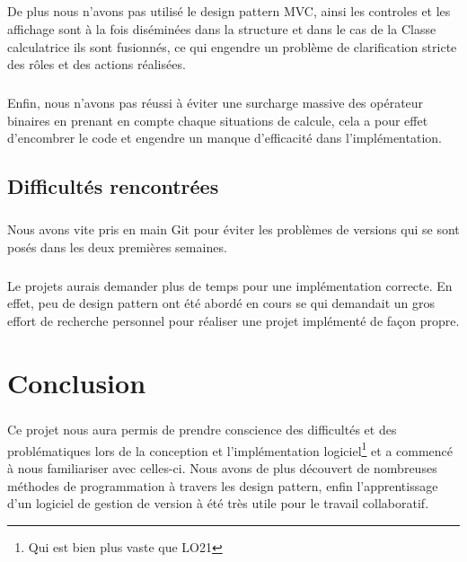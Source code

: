 \documentclass[a4paper,12pt]{report}
\begin{document}
		\paragraph{}De plus nous n'avons pas utilisé le design pattern MVC, ainsi les controles et les affichage sont à la fois diséminées dans la structure et dans le cas de la Classe calculatrice ils sont fusionnés, ce qui engendre un problème de clarification stricte des rôles et des actions réalisées.

		\paragraph{}Enfin, nous n'avons pas réussi à éviter une surcharge massive des opérateur binaires en prenant en compte chaque situations de calcule, cela a pour effet d'encombrer le code et engendre un manque d'efficacité dans l'implémentation.
		
	\section{Difficultés rencontrées}
		\paragraph{}Nous avons vite pris en main Git pour éviter les problèmes de versions qui se sont posés dans les deux premières semaines.
		
		\paragraph{}Le projets aurais demander plus de temps pour une implémentation correcte. En effet, peu de design pattern ont été abordé en cours se qui demandait un gros effort de recherche personnel pour réaliser une projet implémenté de façon propre.
		
\chapter*{Conclusion}
	\paragraph{}Ce projet nous aura permis de prendre conscience des difficultés et des problématiques lors de la conception et l'implémentation logiciel\footnote{Qui est bien plus vaste que LO21} et a commencé à nous familiariser avec celles-ci. Nous avons de plus découvert de nombreuses méthodes de programmation à travers les design pattern, enfin l'apprentissage d'un logiciel de gestion de version à été très utile pour le travail collaboratif.

\listoffigures
\end{document}
